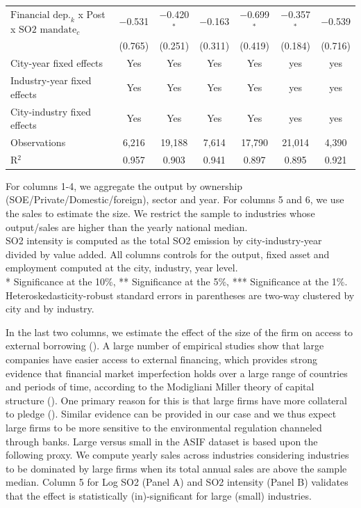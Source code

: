 \documentclass[12pt]{article}
\begin{document}
\begin{table}[hbt!]
{\begin{threeparttable}
\begin{tabular}{l*{6}{c}}
    $\text{Financial dep.}_k$ x Post x $\text{SO2 mandate}_c$ & $-$0.531& $-$0.420$^{*}$ & $-$0.163 & $-$0.699$^{*}$ & $-$0.357$^{*}$ & $-$0.539 \\ 
  & (0.765) & (0.251) & (0.311) & (0.419) & (0.184) & (0.716) \\
    \midrule 
    
    City-year fixed effects & Yes & Yes & Yes & Yes & yes & yes \\ 
    Industry-year fixed effects & Yes & Yes & Yes & Yes & yes & yes \\ 
    City-industry fixed effects & Yes & Yes & Yes & Yes & yes & yes \\ 
    Observations & 6,216 & 19,188 & 7,614 & 17,790 & 21,014 & 4,390 \\ 
    R$^{2}$ & 0.957 &0.903  & 0.941 & 0.897 & 0.895 & 0.921 \\ 
    
    \bottomrule
  \end{tabular}
  \begin{tablenotes}
      \small
      \item For columns 1-4, we aggregate the output by ownership (SOE/Private/Domestic/foreign), sector and year. For columns 5 and 6, we use the sales to estimate the size. We restrict the sample to industries whose output/sales are higher than the yearly national median. \\
      SO2 intensity is computed as the total SO2 emission by city-industry-year divided by value added. All columns controls for the output, fixed asset and employment computed at the city, industry, year level. \\
      * Significance at the 10\%, ** Significance at the 5\%, *** Significance at the 1\%. Heteroskedasticity-robust standard errors in parentheses are two-way clustered by city and by industry.
    \end{tablenotes}
    \label{tab:table4}
\end{threeparttable}}
\end{table}

In the last two columns, we estimate the effect of the size of the firm on access to external borrowing (\cite{Beck2006-qy}). A large number of empirical studies show that large companies have easier access to external financing, which provides strong evidence that financial market imperfection holds over a large range of countries and periods of time, according to the Modigliani Miller theory of capital structure (\cite{Modigliani1958-nu}). One primary reason for this is that large firms have more collateral to pledge (\cite{Andersen2015-pa}). Similar evidence can be provided in our case and we thus expect large firms to be more sensitive to the environmental regulation channeled through banks. Large versus small in the ASIF dataset is based upon the following proxy. We compute yearly sales across industries considering industries to be dominated by large firms when its total annual sales are above the sample median. Column 5 for Log SO2 (Panel A) and SO2 intensity (Panel B) validates that the effect is statistically (in)-significant for large (small) industries.
\end{document}
